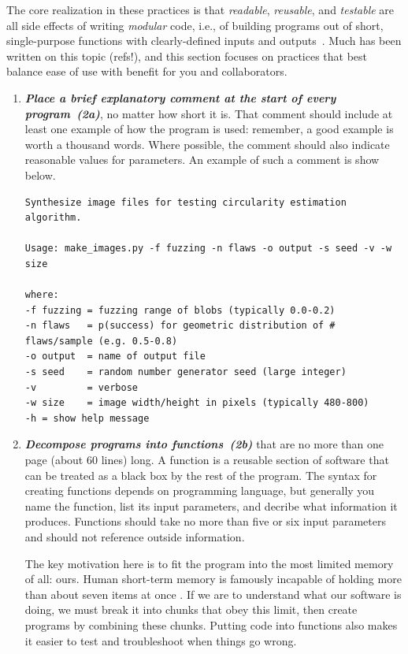 \documentclass[10pt,letterpaper]{article}
\newcommand{\practice}[2]{\textbf{\emph{{#2}~({#1})}}}
\begin{document}
The core realization in these practices is that \emph{readable},
\emph{reusable}, and \emph{testable} are all side effects of writing
\emph{modular} code, i.e., of building programs out of short,
single-purpose functions with clearly-defined inputs and
outputs~\cite{hunt1999}. Much has been written on this topic (refs!),
and this section focuses on practices that best balance ease of use
with benefit for you and collaborators.

\begin{enumerate}

\item

  \practice{2a}{Place a brief explanatory comment at the start of
  every program}, no matter how short it is. That comment should
  include at least one example of how the program is used: remember, a
  good example is worth a thousand words. Where possible, the comment
  should also indicate reasonable values for parameters.  An example
  of such a comment is show below.

{\small
\begin{verbatim}
Synthesize image files for testing circularity estimation algorithm.

Usage: make_images.py -f fuzzing -n flaws -o output -s seed -v -w size

where:
-f fuzzing = fuzzing range of blobs (typically 0.0-0.2)
-n flaws   = p(success) for geometric distribution of # flaws/sample (e.g. 0.5-0.8)
-o output  = name of output file
-s seed    = random number generator seed (large integer)
-v         = verbose
-w size    = image width/height in pixels (typically 480-800)
-h = show help message
\end{verbatim}
}

\item

  \practice{2b}{Decompose programs into functions} that are no more
  than one page (about 60 lines) long. A function is a reusable
  section of software that can be treated as a black box by the rest
  of the program. The syntax for creating functions depends on
  programming language, but generally you name the function, list its
  input parameters, and decribe what information it produces.
  Functions should take no more than five or six input parameters and
  should not reference outside information.

  The key motivation here is to fit the program into the most limited
  memory of all: ours. Human short-term memory is famously incapable
  of holding more than about seven items at once \cite{miller1956}. If
  we are to understand what our software is doing, we must break it
  into chunks that obey this limit, then create programs by combining
  these chunks. Putting code into functions also makes it easier to
  test and troubleshoot when things go wrong.


\end{enumerate}
\end{document}
